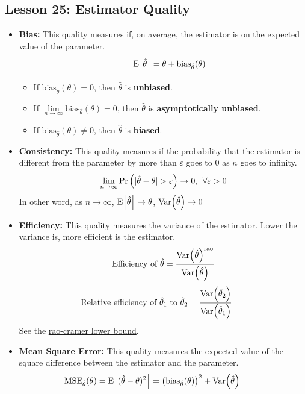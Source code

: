 \documentclass[10pt, french]{article}
\begin{document}
\begin{multicols*}{3}
\section*{Lesson 25: Estimator Quality}
\begin{itemize}[align=left,leftmargin=*]
    \item \textbf{Bias:} This quality measures if, on average, the estimator is on the expected value of the parameter. \[\hspace*{.5cm} \mathrm{E} {\left[ \hat{\theta} \right]} = \theta + \mathrm{bias}_{\hat{\theta}}(\theta) \]
    \begin{itemize}
        \item If $\mathrm{bias}_{\hat{\theta}}(\theta) = 0$, then $\hat{\theta}$ is \textbf{unbiased}.
        \item If $\lim\limits_{n\to \infty} \mathrm{bias}_{\hat{\theta}}(\theta) = 0$, then $\hat{\theta}$ is \textbf{asymptotically unbiased}.
        \item If $\mathrm{bias}_{\hat{\theta}}(\theta) \neq 0$, then $\hat{\theta}$ is \textbf{biased}.
    \end{itemize}
    \item \textbf{Consistency:} This quality measures if the probability that the estimator is different from the parameter by more than $\varepsilon$ goes to $0$ as $n$ goes to infinity. \[ \lim_{n\to \infty} \prob{|\hat{\theta} - \theta|>\varepsilon} \to 0,\:\: \forall \varepsilon>0 \] In other word, as $n\to \infty$, $\mathrm{E} {\left[ \hat{\theta} \right]}\to \theta$, $\mathrm{Var} {\left( \hat{\theta} \right)}\to 0$
    \item \textbf{Efficiency:} This quality measures the variance of the estimator. Lower the variance is, more efficient is  the estimator.
    \[  \text{Efficiency of $\hat{\theta}$}= \frac{\mathrm{Var} {\left( \hat{\theta} \right)}^{\textrm{rao}}}{\mathrm{Var} {\left( \hat{\theta} \right)}} \]
    \[ \hspace{-0.6cm} \text{Relative efficiency of $\hat{\theta}_1$ to $\hat{\theta}_2$} = \frac{\var{\hat{\theta}_2}}{\var{\hat{\theta}_1}} \]
    See the {\color{AppendixColor} \hyperref[Def:rao-cramer bound]{rao-cramer lower bound}}.
    \item \textbf{Mean Square Error:} This quality measures the expected value of the square difference between the estimator and the parameter.
    \begin{align*}
        \hspace*{-.6cm}
        \mathrm{MSE}_{\hat{\theta}}(\theta) &= \esp{(\hat{\theta} - \theta)^2}
                                            = \left(\mathrm{bias}_{\hat{\theta}}(\theta)\right)^2 + \var{\hat{\theta}}

\end{align*}
\end{itemize}
\end{multicols*}
\end{document}
